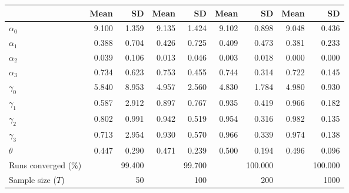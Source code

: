
\begin{tabular}[t]{lrrrrrrrr}
\toprule
  & Mean & SD & Mean  & SD  & Mean   & SD   & Mean    & SD   \\
\midrule
$\alpha_{0}$ & 9.100 & 1.359 & 9.135 & 1.424 & 9.102 & 0.898 & 9.048 & 0.436\\
$\alpha_{1}$ & 0.388 & 0.704 & 0.426 & 0.725 & 0.409 & 0.473 & 0.381 & 0.233\\
$\alpha_{2}$ & 0.039 & 0.106 & 0.013 & 0.046 & 0.003 & 0.018 & 0.000 & 0.000\\
$\alpha_{3}$ & 0.734 & 0.623 & 0.753 & 0.455 & 0.744 & 0.314 & 0.722 & 0.145\\
$\gamma_{0}$ & 5.840 & 8.953 & 4.957 & 2.560 & 4.830 & 1.784 & 4.980 & 0.930\\
$\gamma_{1}$ & 0.587 & 2.912 & 0.897 & 0.767 & 0.935 & 0.419 & 0.966 & 0.182\\
$\gamma_{2}$ & 0.802 & 0.991 & 0.942 & 0.519 & 0.954 & 0.316 & 0.982 & 0.135\\
$\gamma_{3}$ & 0.713 & 2.954 & 0.930 & 0.570 & 0.966 & 0.339 & 0.974 & 0.138\\
$\theta$ & 0.447 & 0.290 & 0.471 & 0.239 & 0.500 & 0.194 & 0.496 & 0.096\\
Runs converged (\%) &  & 99.400 &  & 99.700 &  & 100.000 &  & 100.000\\
Sample size ($T$) &  & 50 &  & 100 &  & 200 &  & 1000\\
\bottomrule
\end{tabular}
